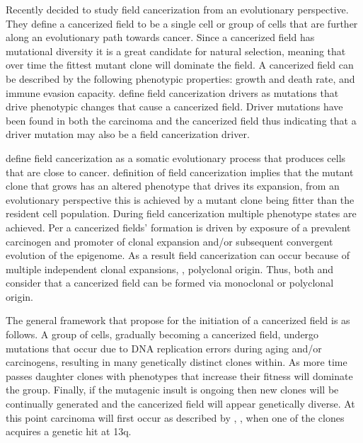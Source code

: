 \documentclass[\main/thesis.tex]{subfiles}
\begin{document}
Recently \textcite{Curtius} decided to study field cancerization from an 
evolutionary perspective. They define a cancerized field to be a single cell or 
group of cells that are further along an evolutionary path towards cancer. Since 
a cancerized field has mutational diversity it is a great candidate for natural 
selection, meaning that over time the fittest mutant clone will dominate the 
field. A cancerized field can be described by the following phenotypic 
properties: growth and death rate, and immune evasion capacity. 
\textcite{Curtius} define field cancerization drivers as mutations that drive 
phenotypic changes that cause a cancerized field. Driver mutations have been 
found in both the carcinoma and the cancerized field thus indicating that a 
driver mutation may also be a field cancerization driver. 

\textcite{Curtius} define field cancerization as a somatic evolutionary 
process that produces cells that are close to cancer. \textcite{Braakhuis} 
definition of field cancerization implies that the mutant clone that grows has 
an altered phenotype that drives its expansion, from an evolutionary perspective 
this is achieved by a mutant clone being fitter than the resident cell 
population. During field cancerization multiple phenotype states are achieved. 
Per \textcite{Curtius} a cancerized fields' formation is driven by exposure 
of a prevalent carcinogen and promoter of clonal expansion and/or subsequent 
convergent evolution of the epigenome. As a result field cancerization can occur 
because of multiple independent clonal expansions, \ie, polyclonal origin. Thus, 
both \textcite{Simple} and \textcite{Curtius} consider that a cancerized field 
can be formed via monoclonal or polyclonal origin.

The general framework that \textcite{Curtius} propose for the initiation of a 
cancerized field is as follows. A group of cells, gradually becoming a 
cancerized field, undergo mutations that occur due to DNA replication errors 
during aging and/or carcinogens, resulting in many genetically distinct clones 
within. As more time passes daughter clones with phenotypes that increase their 
fitness will dominate the group. Finally, if the mutagenic insult is ongoing 
then new clones will be continually generated and the cancerized field will 
appear genetically diverse. At this point carcinoma will first occur as 
described by \textcite{Simple}, \ie, when one of the clones acquires a 
genetic hit at 13q.  
\end{document}
